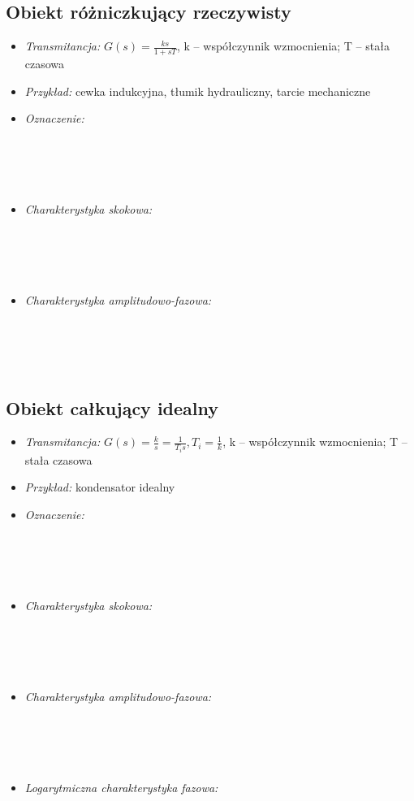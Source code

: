 \documentclass[a4paper]{article}
\begin{document}
\subsection{Obiekt różniczkujący rzeczywisty}
\begin{itemize}
\item \emph{Transmitancja: } $G(s) = \frac{ks}{1+sT}$, k -- współczynnik wzmocnienia; T -- stała czasowa
\item \emph{Przykład: } cewka indukcyjna, tłumik hydrauliczny, tarcie mechaniczne
\item \emph {Oznaczenie: } \\\\\\\\\\
\item \emph{Charakterystyka skokowa: } \\\\\\\\\\
\item \emph{Charakterystyka amplitudowo-fazowa: } \\\\\\\\\\
\end{itemize}
\subsection{Obiekt całkujący idealny}
\begin{itemize}
\item \emph{Transmitancja: } $G(s) = \frac{k}{s} = \frac{1}{T_is}, T_i = \frac{1}{k}$, k -- współczynnik wzmocnienia; T -- stała czasowa
\item \emph{Przykład: } kondensator idealny
\item \emph {Oznaczenie: } \\\\\\\\\\
\item \emph{Charakterystyka skokowa: } \\\\\\\\\\
\item \emph{Charakterystyka amplitudowo-fazowa: } \\\\\\\\\\
\item \emph{Logarytmiczna charakterystyka fazowa: } \\\\\\\\\\
\end{itemize} \pagebreak
\end{document}
